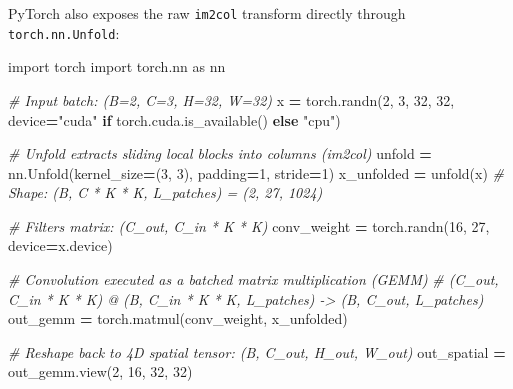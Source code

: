\documentclass[
  letterpaper,
]{scrbook}
\newenvironment{Shaded}{\begin{snugshade}}{\end{snugshade}}
\newcommand{\CommentTok}[1]{\textcolor[rgb]{0.56,0.35,0.01}{\textit{#1}}}
\newcommand{\ControlFlowTok}[1]{\textcolor[rgb]{0.13,0.29,0.53}{\textbf{#1}}}
\newcommand{\DecValTok}[1]{\textcolor[rgb]{0.00,0.00,0.81}{#1}}
\newcommand{\ImportTok}[1]{#1}
\newcommand{\NormalTok}[1]{#1}
\newcommand{\OperatorTok}[1]{\textcolor[rgb]{0.81,0.36,0.00}{\textbf{#1}}}
\newcommand{\StringTok}[1]{\textcolor[rgb]{0.31,0.60,0.02}{#1}}
\begin{document}
\begin{tcolorbox}
PyTorch also exposes the raw \texttt{im2col} transform directly through
\texttt{torch.nn.Unfold}:

\begin{Shaded}
\begin{Highlighting}[]
\ImportTok{import}\NormalTok{ torch}
\ImportTok{import}\NormalTok{ torch.nn }\ImportTok{as}\NormalTok{ nn}

\CommentTok{\# Input batch: (B=2, C=3, H=32, W=32)}
\NormalTok{x }\OperatorTok{=}\NormalTok{ torch.randn(}\DecValTok{2}\NormalTok{, }\DecValTok{3}\NormalTok{, }\DecValTok{32}\NormalTok{, }\DecValTok{32}\NormalTok{, device}\OperatorTok{=}\StringTok{"cuda"} \ControlFlowTok{if}\NormalTok{ torch.cuda.is\_available() }\ControlFlowTok{else} \StringTok{"cpu"}\NormalTok{)}

\CommentTok{\# Unfold extracts sliding local blocks into columns (im2col)}
\NormalTok{unfold }\OperatorTok{=}\NormalTok{ nn.Unfold(kernel\_size}\OperatorTok{=}\NormalTok{(}\DecValTok{3}\NormalTok{, }\DecValTok{3}\NormalTok{), padding}\OperatorTok{=}\DecValTok{1}\NormalTok{, stride}\OperatorTok{=}\DecValTok{1}\NormalTok{)}
\NormalTok{x\_unfolded }\OperatorTok{=}\NormalTok{ unfold(x)  }\CommentTok{\# Shape: (B, C * K * K, L\_patches) = (2, 27, 1024)}

\CommentTok{\# Filters matrix: (C\_out, C\_in * K * K)}
\NormalTok{conv\_weight }\OperatorTok{=}\NormalTok{ torch.randn(}\DecValTok{16}\NormalTok{, }\DecValTok{27}\NormalTok{, device}\OperatorTok{=}\NormalTok{x.device)}

\CommentTok{\# Convolution executed as a batched matrix multiplication (GEMM)}
\CommentTok{\# (C\_out, C\_in * K * K) @ (B, C\_in * K * K, L\_patches) {-}\textgreater{} (B, C\_out, L\_patches)}
\NormalTok{out\_gemm }\OperatorTok{=}\NormalTok{ torch.matmul(conv\_weight, x\_unfolded)}

\CommentTok{\# Reshape back to 4D spatial tensor: (B, C\_out, H\_out, W\_out)}
\NormalTok{out\_spatial }\OperatorTok{=}\NormalTok{ out\_gemm.view(}\DecValTok{2}\NormalTok{, }\DecValTok{16}\NormalTok{, }\DecValTok{32}\NormalTok{, }\DecValTok{32}\NormalTok{)}
\end{Highlighting}
\end{Shaded}

\end{tcolorbox}

\end{document}
